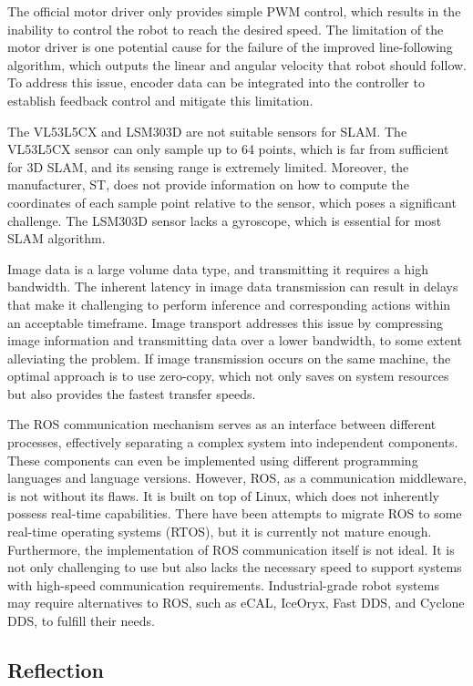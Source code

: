 The official motor driver only provides simple PWM control, which results in the inability to control the robot to reach the desired speed. The limitation of the motor driver is one potential cause for the failure of the improved line-following algorithm, which outputs the linear and angular velocity that robot should follow. To address this issue, encoder data can be integrated into the controller to establish feedback control and mitigate this limitation.

The VL53L5CX and LSM303D are not suitable sensors for SLAM. The VL53L5CX sensor can only sample up to 64 points, which is far from sufficient for 3D SLAM, and its sensing range is extremely limited. Moreover, the manufacturer, ST, does not provide information on how to compute the coordinates of each sample point relative to the sensor, which poses a significant challenge. The LSM303D sensor lacks a gyroscope, which is essential for most SLAM algorithm.

Image data is a large volume data type, and transmitting it requires a high bandwidth. The inherent latency in image data transmission can result in delays that make it challenging to perform inference and corresponding actions within an acceptable timeframe. Image transport addresses this issue by compressing image information and transmitting data over a lower bandwidth, to some extent alleviating the problem. If image transmission occurs on the same machine, the optimal approach is to use zero-copy, which not only saves on system resources but also provides the fastest transfer speeds.

The ROS communication mechanism serves as an interface between different processes, effectively separating a complex system into independent components. These components can even be implemented using different programming languages and language versions. However, ROS, as a communication middleware, is not without its flaws. It is built on top of Linux, which does not inherently possess real-time capabilities. There have been attempts to migrate ROS to some real-time operating systems (RTOS), but it is currently not mature enough. Furthermore, the implementation of ROS communication itself is not ideal. It is not only challenging to use but also lacks the necessary speed to support systems with high-speed communication requirements. Industrial-grade robot systems may require alternatives to ROS, such as eCAL, IceOryx, Fast DDS, and Cyclone DDS, to fulfill their needs.

\subsection{Reflection}


